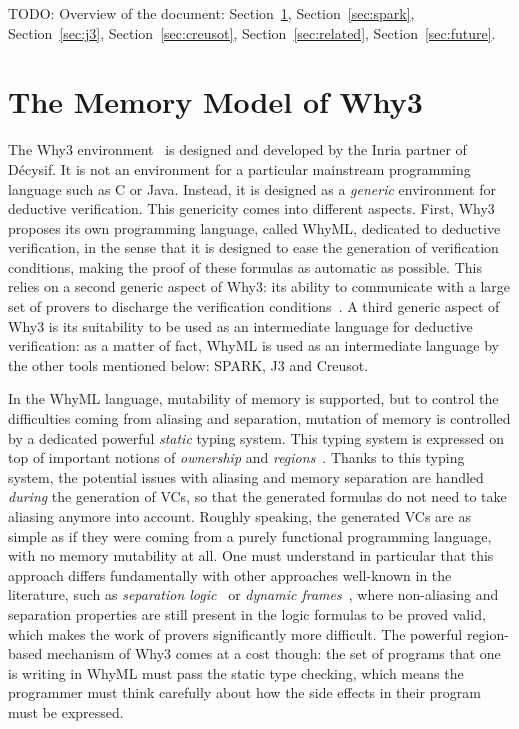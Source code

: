 \documentclass[a4paper,11pt]{article}
\begin{document}
TODO: Overview of the document: Section~\ref{sec:why3}, Section~\ref{sec:spark},
Section~\ref{sec:j3}, Section~\ref{sec:creusot}, Section~\ref{sec:related},
Section~\ref{sec:future}.

\section{The Memory Model of Why3}
\label{sec:why3}


The Why3
environment~\cite{filliatre13esop,bobot14sttt,blazy19fmtea,paskevich20isola} is
designed and developed by the Inria partner of Décysif. It is not an environment
for a particular mainstream programming language such as C or Java. Instead, it
is designed as a \emph{generic} environment for deductive verification. This
genericity comes into different aspects. First, Why3 proposes its own
programming language, called WhyML, dedicated to deductive verification, in the
sense that it is designed to ease the generation of verification conditions,
making the proof of these formulas as automatic as possible. This relies on a
second generic aspect of Why3: its ability to communicate with a large set of
provers to discharge the verification conditions~\cite{boogie11why3}. A third
generic aspect of Why3 is its suitability to be used as an intermediate language
for deductive verification: as a matter of fact, WhyML is used as an
intermediate language by the other tools mentioned below: SPARK, J3 and Creusot.

In the WhyML language, mutability of memory is supported, but to control the
difficulties coming from aliasing and separation, mutation of memory is
controlled by a dedicated powerful \emph{static} typing system. This typing
system is expressed on top of important notions of \emph{ownership} and
\emph{regions}~\cite{gondelman16reg}. Thanks to this typing system, the
potential issues with aliasing and memory separation are handled \emph{during}
the generation of VCs, so that the generated formulas do not need to take
aliasing anymore into account. Roughly speaking, the generated VCs are as simple
as if they were coming from a purely functional programming language, with no
memory mutability at all. One must understand in particular that this approach
differs fundamentally with other approaches well-known in the literature, such
as \emph{separation logic}~\cite{Tuch_KN_07} or \emph{dynamic
  frames}~\cite{Smans09}, where non-aliasing and separation properties are still
present in the logic formulas to be proved valid, which makes the work of
provers significantly more difficult. The powerful region-based mechanism of
Why3 comes at a cost though: the set of programs that one is writing in WhyML
must pass the static type checking, which means the programmer must think carefully
about how the side effects in their program must be expressed.
\end{document}
